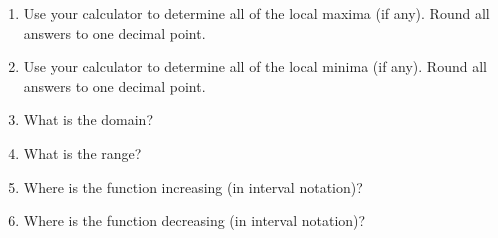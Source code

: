 \documentclass[letterpaper,12pt,fleqn]{article}
\begin{document}
\begin{enumerate}
\begin{enumerate}
  \item Use your calculator to determine all of the local maxima (if any).
    Round all answers to one decimal point.

    \vspace{1in}

  \item Use your calculator to determine all of the local minima (if any).
    Round all answers to one decimal point.

    \vspace{1in}
    
  \item What is the domain?

    \vspace{1in}
    
  \item What is the range?

    \vspace{1in}
    
  \item Where is the function increasing (in interval notation)?

    \vspace{1in}
    
  \item Where is the function decreasing (in interval notation)?
  \end{enumerate}
  
\end{enumerate}
\end{document}
